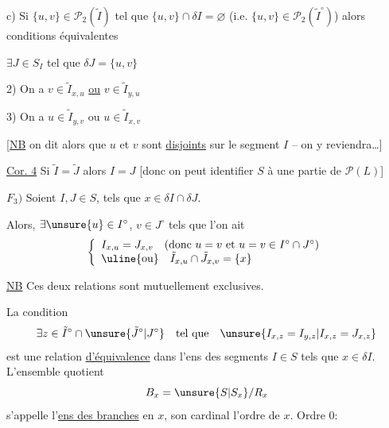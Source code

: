 c) Si $\{u,v\}\in\mathcal P_2(\tilde I)$ tel que $\{u,v\}\cap\delta I=\varnothing$
(i.e. $\{u,v\}\in\mathcal P_2(\tilde I^\circ)$) alors conditions équivalentes

  $\exists J\in S_I$ tel que $\delta J=\{u,v\}$

2) On a $v\in\tilde I_{x,u}$ \uline{ou} $v\in\tilde I_{y,u}$

3) On a $u\in\tilde I_{y,v}$ ou $u\in\tilde I_{x,v}$


[\uline{NB} on dit alors que $u$ et $v$ sont  \uline{disjoints} sur le segment $I$ -- on y reviendra\ldots]

\uline{Cor. 4} Si $\tilde I=\tilde J$ alors $I=J$ [donc on peut identifier $S$ à une partie de $\mathcal P(L)$]

$F_3)$ Soient $I,J\in S$,  tels que $x\in\delta I\cap\delta J$.

Alors,  \deleted{$\unsure{\exists}$}
$\exists\unsure{u}\in I^\circ$, $v\in J^\circ$ tels que  l'on ait
\[
\left\{
\begin{array}{l}
I_{x,u}=J_{x,v}\quad(\text{donc }u=v\text{ et }u=v\in I^\circ\cap J^\circ)\\
\uline{\text{ou}}\quad \tilde I_{x,u}\cap\tilde J_{x,v}=\{x\}
\end{array}
\right.
\]

\uline{NB} Ces deux relations sont mutuellement exclusives.

La condition
\[
\exists z\in\tilde I^\circ\cap\unsure{\tilde J^\circ|J^\circ}
\quad\text{tel que}\quad
\unsure{I_{x,z}=I_{y,z}|I_{x,z}=J_{x,z}}
\]
est une relation \uline{d'équivalence}  dans l'ens  des segments $I\in S$ tels que $x\in\delta I$.
L'ensemble quotient
\[
B_x=\unsure{S|S_x}/R_x
\]
s'appelle l'\uline{ens des branches} en $x$, son cardinal l'ordre de $x$. Ordre 0:

